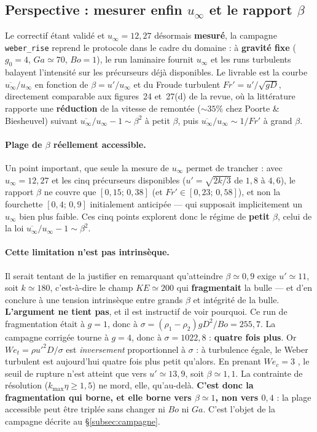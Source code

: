 \subsection{Perspective : mesurer enfin \texorpdfstring{$u_\infty$}{u\_inf} et le rapport
\texorpdfstring{$\beta$}{beta}}

Le correctif étant validé et $u_\infty = 12{,}27$ désormais \textbf{mesuré}, la
campagne \texttt{weber\_rise} reprend le protocole dans le cadre du domaine
\cite{legendre2025} : à \textbf{gravité fixe} ($g_0=4$, $Ga\simeq70$, $Bo=1$), le
run laminaire fournit $u_\infty$ et les runs turbulents balayent l'intensité sur les
précurseurs déjà disponibles. Le livrable est la courbe
$\overline{u_\infty}/u_\infty$ en fonction de $\beta = u'/u_\infty$ et du Froude
turbulent $Fr' = u'/\sqrt{gD}$, directement comparable aux figures~24 et~27(d) de la
revue, où la littérature rapporte une \textbf{réduction} de la vitesse de remontée
(${\sim}35\%$ chez Poorte \& Biesheuvel) suivant
$\overline{u_\infty}/u_\infty - 1 \sim \beta^2$ à petit $\beta$, puis
$\overline{u_\infty}/u_\infty \sim 1/Fr'$ à grand $\beta$.

\paragraph{Plage de $\beta$ réellement accessible.} Un point important, que seule la
mesure de $u_\infty$ permet de trancher : avec $u_\infty=12{,}27$ et les cinq
précurseurs disponibles ($u' = \sqrt{2k/3}$ de $1{,}8$ à $4{,}6$), le rapport
$\beta$ ne couvre que $[0{,}15;\,0{,}38]$ (et $Fr'\in[0{,}23;\,0{,}58]$), et non la
fourchette $[0{,}4;\,0{,}9]$ initialement anticipée --- qui supposait implicitement
un $u_\infty$ bien plus faible. Ces cinq points explorent donc le régime de
\textbf{petit $\beta$}, celui de la loi
$\overline{u_\infty}/u_\infty - 1 \sim \beta^2$.

\paragraph{Cette limitation n'est pas intrinsèque.} Il serait tentant de la justifier
en remarquant qu'atteindre $\beta\simeq0{,}9$ exige $u'\simeq11$, soit $k\simeq180$,
c'est-à-dire le champ $KE\simeq200$ qui \textbf{fragmentait} la bulle --- et d'en
conclure à une tension intrinsèque entre grands $\beta$ et intégrité de la bulle.
\textbf{L'argument ne tient pas}, et il est instructif de voir pourquoi. Ce run de
fragmentation était à $g=1$, donc à $\sigma=(\rho_1-\rho_2)gD^2/Bo=255{,}7$. La
campagne corrigée tourne à $g=4$, donc à $\sigma=1022{,}8$ : \textbf{quatre fois
plus}. Or $We_t=\rho u'^2D/\sigma$ est \emph{inversement} proportionnel à $\sigma$ :
à turbulence égale, le Weber turbulent est aujourd'hui quatre fois plus petit
qu'alors. En prenant $We_c=3$ \cite{riviere2021}, le seuil de rupture n'est atteint
que vers $u'\simeq13{,}9$, soit $\beta\simeq1{,}1$. La contrainte de résolution
($k_{\max}\eta\ge1{,}5$) ne mord, elle, qu'au-delà. \textbf{C'est donc la
fragmentation qui borne, et elle borne vers $\beta\simeq1$, non vers $0{,}4$} : la
plage accessible peut être triplée sans changer ni $Bo$ ni $Ga$. C'est l'objet de la
campagne décrite au \S\ref{subsec:campagne}.

